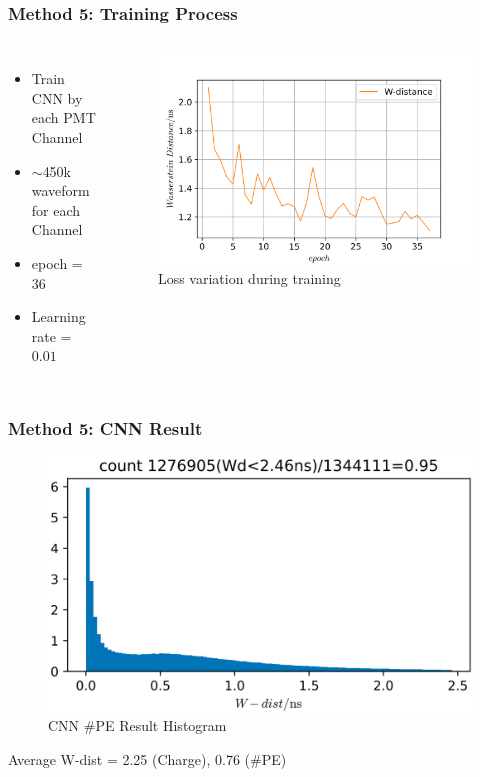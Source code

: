 \documentclass{beamer}
\begin{document}
\begin{frame}
\frametitle{Method 5: Training Process}
\begin{columns}
\begin{itemize}
    \item Train CNN by each PMT Channel
    \item $\sim$450k waveform for each Channel
    \item epoch = 36
    \item Learning rate = $0.01$
\end{itemize}
\begin{figure}
    \centering
    \caption{Loss variation during training}
    \includegraphics[width=1.0\linewidth]{img/epoch.png}
\end{figure}
\end{columns}
\end{frame}

\begin{frame}
\frametitle{Method 5: CNN Result}
\begin{figure}
    \centering
    \caption{CNN \#PE Result Histogram}
    \includegraphics[width=0.85\linewidth]{img/takarapenumhist.png}
\end{figure}
\begin{center}
    Average W-dist = 2.25 (Charge), 0.76 (\#PE)
\end{center}
\end{frame}
\end{document}
